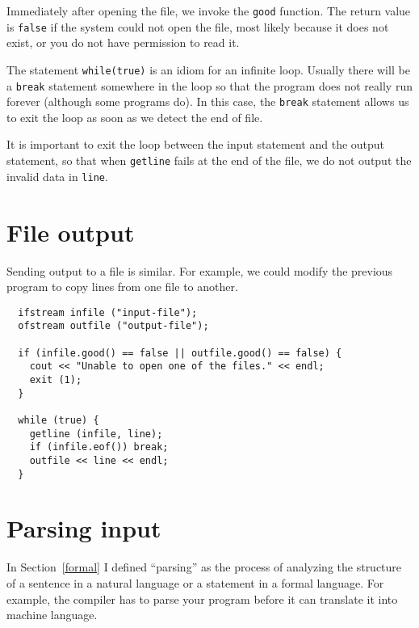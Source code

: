 
Immediately after opening the file, we invoke the {\tt good} function.
The return value is {\tt false} if the system could not open the file,
most likely because it does not exist, or you do not have permission
to read it.


The statement {\tt while(true)} is an idiom for an infinite
loop.  Usually there will be a {\tt break} statement somewhere in
the loop so that the program does not really run forever (although
some programs do).  In this case, the {\tt break} statement allows
us to exit the loop as soon as we detect the end of file.


It is important to exit the loop between the input statement and
the output statement, so that when {\tt getline} fails at the
end of the file, we do not output the invalid data in {\tt line}.

\section{File output}

Sending output to a file is similar.  For example, we could
modify the previous program to copy lines from one file to
another.

\begin{verbatim}
  ifstream infile ("input-file");
  ofstream outfile ("output-file");

  if (infile.good() == false || outfile.good() == false) {
    cout << "Unable to open one of the files." << endl;
    exit (1);
  }

  while (true) {
    getline (infile, line);
    if (infile.eof()) break;
    outfile << line << endl;
  }
\end{verbatim}

\section{Parsing input}
\label{parsing}

In Section~\ref{formal} I defined ``parsing'' as the process of
analyzing the structure of a sentence in a natural language or a
statement in a formal language.  For example, the compiler has to
parse your program before it can translate it into machine language.

